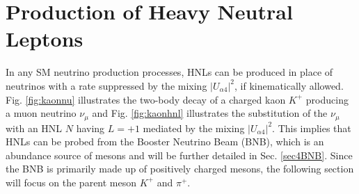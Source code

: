 
 
\section{Production of Heavy Neutral Leptons}
\label{sec2Production}
In any SM neutrino production processes, HNLs can be produced in place of neutrinos with a rate suppressed by the mixing $|U_{\alpha4}|^{2}$, if kinematically allowed. 
Fig. \ref{fig:kaonnu} illustrates the two-body decay of a charged kaon $K^+$ producing a muon neutrino $\nu_{\mu}$ and Fig. \ref{fig:kaonhnl} illustrates the substitution of the $\nu_{\mu}$ with an HNL $N$ having $L = +1$ mediated by the mixing $|U_{\alpha4}|^{2}$. 
This implies that HNLs can be probed from the Booster Neutrino Beam (BNB), which is an abundance source of mesons and will be further detailed in Sec. \ref{sec4BNB}.
Since the BNB is primarily made up of positively charged mesons, the following section will focus on the parent meson $K^+$ and $\pi^+$.  

